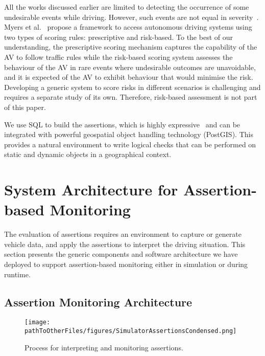 All the works discussed earlier are limited to detecting the occurrence of some undesirable events while driving. However, such events are not equal in severity~\cite{sinha}. Myers et al.~\cite{myers} propose a framework to access autonomous driving systems using two types of scoring rules: prescriptive and risk-based. To the best of our understanding, the prescriptive scoring mechanism captures the capability of the AV to follow traffic rules while the risk-based scoring system assesses the behaviour of the AV in rare events where undesirable outcomes are unavoidable, and it is expected of the AV to exhibit behaviour that would minimise the risk. Developing a generic system to score risks in different scenarios is challenging and requires a separate study of its own. Therefore, risk-based assessment is not part of this paper.

We use SQL to build the assertions, which is highly expressive~\cite{sqllibkin} and can be integrated with powerful geospatial object handling technology (PostGIS). This provides a natural environment to write logical checks that can be performed on static and dynamic objects in a geographical context. 
%



\section{System Architecture for Assertion-based Monitoring} \label{generic_architecture}

The evaluation of assertions requires an environment to capture or generate vehicle data, and apply the assertions to interpret the driving situation. This section presents the generic components and software architecture we have deployed to support assertion-based monitoring either in simulation or during runtime.

\subsection{Assertion Monitoring Architecture} \label{generic_sim_system}

\begin{figure}
    \centering
    \texttt{[image: \\pathToOtherFiles/figures/SimulatorAssertionsCondensed.png]}
    \caption{Process for interpreting and monitoring assertions.}
    \label{fig:SimulatorArchitecture}
\end{figure}


